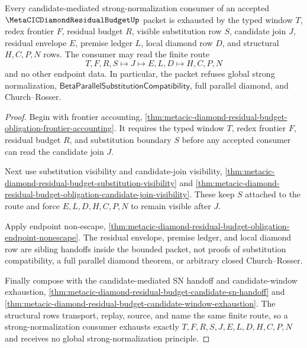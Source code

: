 \begin{theorem}
\label{thm:metacic-diamond-residual-budget-exhaustion}
Every candidate-mediated strong-normalization consumer of an accepted $\MetaCICDiamondResidualBudgetUp$ packet is exhausted by the typed window $T$, redex frontier $F$, residual budget $R$, visible substitution row $S$, candidate join $J$, residual envelope $E$, premise ledger $L$, local diamond row $D$, and structural $H,C,P,N$ rows. The consumer may read the finite route
$$
T,F,R,S \longmapsto J \longmapsto E,L,D \longmapsto H,C,P,N
$$
and no other endpoint data. In particular, the packet refuses global strong normalization, $\mathsf{BetaParallelSubstitutionCompatibility}$, full parallel diamond, and Church--Rosser.
\end{theorem}
\begin{proof}
Begin with frontier accounting, \autoref{thm:metacic-diamond-residual-budget-obligation-frontier-accounting}. It requires the typed window $T$, redex frontier $F$, residual budget $R$, and substitution boundary $S$ before any accepted consumer can read the candidate join $J$.

Next use substitution visibility and candidate-join visibility, \autoref{thm:metacic-diamond-residual-budget-substitution-visibility} and \autoref{thm:metacic-diamond-residual-budget-obligation-candidate-join-visibility}. These keep $S$ attached to the route and force $E,L,D,H,C,P,N$ to remain visible after $J$.

Apply endpoint non-escape, \autoref{thm:metacic-diamond-residual-budget-obligation-endpoint-nonescape}. The residual envelope, premise ledger, and local diamond row are sibling handoffs inside the bounded packet, not proofs of substitution compatibility, a full parallel diamond theorem, or arbitrary closed Church--Rosser.

Finally compose with the candidate-mediated SN handoff and candidate-window exhaustion, \autoref{thm:metacic-diamond-residual-budget-candidate-sn-handoff} and \autoref{thm:metacic-diamond-residual-budget-candidate-window-exhaustion}. The structural rows transport, replay, source, and name the same finite route, so a strong-normalization consumer exhausts exactly $T,F,R,S,J,E,L,D,H,C,P,N$ and receives no global strong-normalization principle.
\end{proof}

